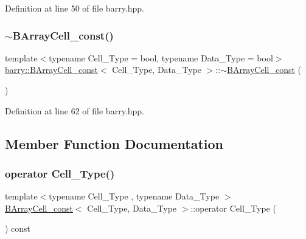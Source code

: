Definition at line 50 of file barry.\+hpp.

\mbox{\label{classbarry_1_1_b_array_cell__const_a8dc243a36580e9de288492eb7a2f19cd}} 
\subsubsection{\texorpdfstring{$\sim$\+B\+Array\+Cell\+\_\+const()}{~BArrayCell\_const()}}
{\footnotesize\ttfamily template$<$typename Cell\+\_\+\+Type  = bool, typename Data\+\_\+\+Type  = bool$>$ \\
\hyperlink{classbarry_1_1_b_array_cell__const}{barry\+::\+B\+Array\+Cell\+\_\+const}$<$ Cell\+\_\+\+Type, Data\+\_\+\+Type $>$\+::$\sim$\hyperlink{classbarry_1_1_b_array_cell__const}{B\+Array\+Cell\+\_\+const} (\begin{DoxyParamCaption}{ }\end{DoxyParamCaption})\hspace{0.3cm}{\ttfamily [inline]}}



Definition at line 62 of file barry.\+hpp.



\subsection{Member Function Documentation}
\mbox{\label{classbarry_1_1_b_array_cell__const_ab5d767055c53b7024380a8011dad698a}} 
\subsubsection{\texorpdfstring{operator Cell\+\_\+\+Type()}{operator Cell\_Type()}}
{\footnotesize\ttfamily template$<$typename Cell\+\_\+\+Type , typename Data\+\_\+\+Type $>$ \\
\hyperlink{classbarry_1_1_b_array_cell__const}{B\+Array\+Cell\+\_\+const}$<$ Cell\+\_\+\+Type, Data\+\_\+\+Type $>$\+::operator Cell\+\_\+\+Type (\begin{DoxyParamCaption}{ }\end{DoxyParamCaption}) const\hspace{0.3cm}{\ttfamily [inline]}}



